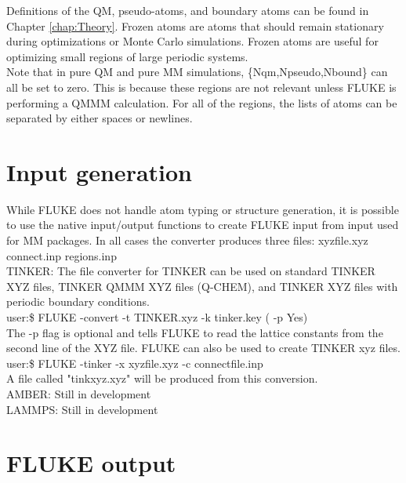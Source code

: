 \documentclass[12pt]{report}
\begin{document}
Definitions of the QM, pseudo-atoms, and boundary atoms can be found in
Chapter \ref{chap:Theory}. Frozen atoms are atoms that should remain
stationary during optimizations or Monte Carlo simulations. Frozen atoms are
useful for optimizing small regions of large periodic systems. \\

Note that in pure QM and pure MM simulations, \{Nqm,Npseudo,Nbound\} can all
be set to zero. This is because these regions are not relevant unless FLUKE is
performing a QMMM calculation. For all of the regions, the lists of atoms can
be separated by either spaces or newlines.

\section{Input generation}

While FLUKE does not handle atom typing or structure generation, it is
possible to use the native input/output functions to create FLUKE input from
input used for MM packages. In all cases the converter produces three
files: xyzfile.xyz connect.inp regions.inp \\

TINKER: The file converter for TINKER can be used on standard
TINKER XYZ files, TINKER QMMM XYZ files (Q-CHEM), and TINKER XYZ files
with periodic boundary conditions. \\

user:\$ FLUKE -convert -t TINKER.xyz -k tinker.key ( -p Yes) \\

The -p flag is optional and tells FLUKE to read the lattice constants from
the second line of the XYZ file. FLUKE can also be used to create TINKER xyz
files. \\

user:\$ FLUKE -tinker -x xyzfile.xyz -c connectfile.inp \\

A file called "tinkxyz.xyz" will be produced from this conversion. \\

AMBER: {\color{red}Still in development} \\

LAMMPS: {\color{red}Still in development}

\section{FLUKE output}
\end{document}
